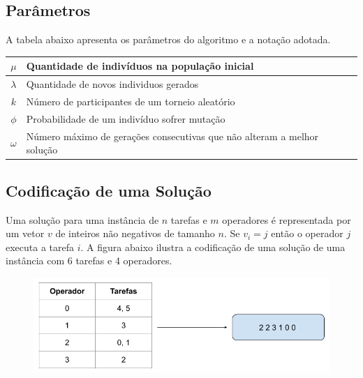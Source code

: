 \documentclass{article}
\begin{document}
\subsection{Parâmetros}
\quad A tabela abaixo apresenta os parâmetros do algoritmo e a notação adotada.
\begin{table}[ht]
\centering
\begin{tabular}{c|l}
\hline
$\mu$ & Quantidade de indivíduos na população inicial \\ \hline
$\lambda$ & Quantidade de novos individuos gerados \\ \hline
$k$ & Número de participantes de um torneio aleatório \\ \hline
$\phi$ & Probabilidade de um indivíduo sofrer mutação \\ \hline
$\omega$ & Número máximo de gerações consecutivas que não alteram a melhor solução \\ \hline
\end{tabular}
\end{table}\subsection{Codificação de uma Solução}
\quad Uma solução para uma instância de $n$ tarefas e $m$ operadores é representada por um vetor $v$ de inteiros não negativos de tamanho $n$. Se $v_{i} = j$ então o operador $j$ executa a tarefa $i$. A figura abaixo ilustra a codificação de uma solução de uma instância com 6 tarefas e 4 operadores.
\begin{figure}[tph!]
\centering
\includegraphics[scale=0.35]{figure1}
\end{figure}


\newpage
\end{document}
